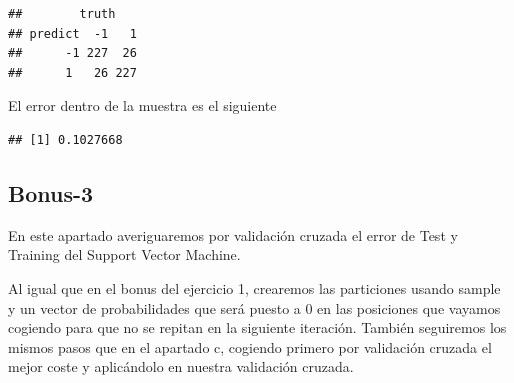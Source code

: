 \documentclass[]{article}
\newenvironment{Shaded}{\begin{snugshade}}{\end{snugshade}}
\newcommand{\KeywordTok}[1]{\textcolor[rgb]{0.13,0.29,0.53}{\textbf{{#1}}}}
\newcommand{\StringTok}[1]{\textcolor[rgb]{0.31,0.60,0.02}{{#1}}}
\newcommand{\NormalTok}[1]{{#1}}
\begin{document}
\begin{verbatim}
##        truth
## predict  -1   1
##      -1 227  26
##      1   26 227
\end{verbatim}

El error dentro de la muestra es el siguiente

\begin{Shaded}
\end{Shaded}

\begin{verbatim}
## [1] 0.1027668
\end{verbatim}

\subsection{Bonus-3}\label{bonus-3}

En este apartado averiguaremos por validación cruzada el error de Test y
Training del Support Vector Machine.

Al igual que en el bonus del ejercicio 1, crearemos las particiones
usando sample y un vector de probabilidades que será puesto a 0 en las
posiciones que vayamos cogiendo para que no se repitan en la siguiente
iteración. También seguiremos los mismos pasos que en el apartado c,
cogiendo primero por validación cruzada el mejor coste y aplicándolo en
nuestra validación cruzada.
\end{document}

